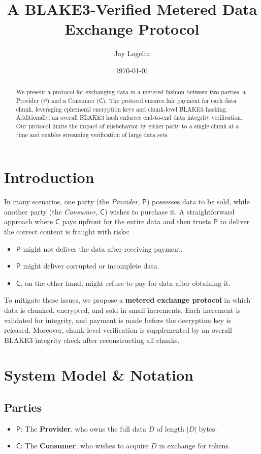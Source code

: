 \documentclass[11pt]{article}
\title{A BLAKE3-Verified Metered Data Exchange Protocol}
\author{Jay Logelin}
\date{\today}
\begin{document}
\maketitle

\begin{abstract}
We present a protocol for exchanging data in a metered fashion between two parties, a Provider ($\mathsf{P}$) and a Consumer ($\mathsf{C}$). 
The protocol ensures fair payment for each data chunk, leveraging ephemeral encryption keys and chunk-level BLAKE3 hashing. 
Additionally, an overall BLAKE3 hash enforces end-to-end data integrity verification. 
Our protocol limits the impact of misbehavior by either party to a single chunk at a time and enables streaming verification of large data sets.
\end{abstract}

\section{Introduction}
In many scenarios, one party (the \emph{Provider}, $\mathsf{P}$) possesses data to be sold, while another party (the \emph{Consumer}, $\mathsf{C}$) wishes to purchase it. 
A straightforward approach where $\mathsf{C}$ pays upfront for the entire data and then trusts $\mathsf{P}$ to deliver the correct content is fraught with risks:
\begin{itemize}
    \item $\mathsf{P}$ might not deliver the data after receiving payment.
    \item $\mathsf{P}$ might deliver corrupted or incomplete data.
    \item $\mathsf{C}$, on the other hand, might refuse to pay for data after obtaining it.
\end{itemize}
To mitigate these issues, we propose a \textbf{metered exchange protocol} in which data is chunked, encrypted, and sold in small increments. 
Each increment is validated for integrity, and payment is made before the decryption key is released. 
Moreover, chunk-level verification is supplemented by an overall BLAKE3 integrity check after reconstructing all chunks.

\section{System Model \& Notation}
\subsection{Parties}
\begin{itemize}
    \item $\mathsf{P}$: The \textbf{Provider}, who owns the full data $D$ of length $|D|$ bytes.
    \item $\mathsf{C}$: The \textbf{Consumer}, who wishes to acquire $D$ in exchange for tokens.
\end{itemize}
\end{document}
